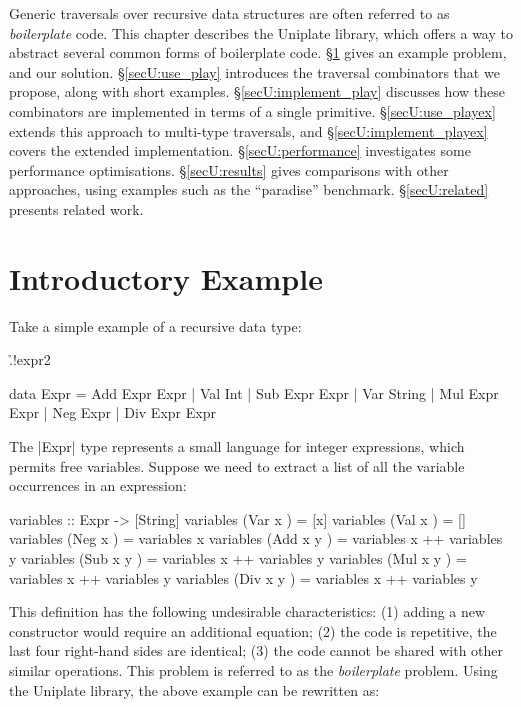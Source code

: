 Generic traversals over recursive data structures are often referred to as \textit{boilerplate} code. This chapter describes the Uniplate library, which offers a way to abstract several common forms of boilerplate code. \S\ref{secU:intro} gives an example problem, and our solution. \S\ref{secU:use_play} introduces the traversal combinators that we propose, along with short examples. \S\ref{secU:implement_play} discusses how these combinators are implemented in terms of a single primitive. \S\ref{secU:use_playex} extends this approach to multi-type traversals, and \S\ref{secU:implement_playex} covers the extended implementation. \S\ref{secU:performance} investigates some performance optimisations. \S\ref{secU:results} gives comparisons with other approaches, using examples such as the ``paradise'' benchmark. \S\ref{secU:related} presents related work.




\section{Introductory Example}
\label{secU:intro}

Take a simple example of a recursive data type:

\h{.!expr2}\begin{code}
data Expr  =  Add  Expr  Expr  |  Val  Int
           |  Sub  Expr  Expr  |  Var  String
           |  Mul  Expr  Expr  |  Neg  Expr
           |  Div  Expr  Expr
\end{code}

The |Expr| type represents a small language for integer expressions, which permits free variables. Suppose we need to extract a list of all the variable occurrences in an expression:

\begin{onepage}
\begin{code}
variables :: Expr -> [String]
variables (Var  x    ) = [x]
variables (Val  x    ) = []
variables (Neg  x    ) = variables x
variables (Add  x y  ) = variables x ++ variables y
variables (Sub  x y  ) = variables x ++ variables y
variables (Mul  x y  ) = variables x ++ variables y
variables (Div  x y  ) = variables x ++ variables y
\end{code}
\end{onepage}

This definition has the following undesirable characteristics: (1) adding a new constructor would require an additional equation; (2) the code is repetitive, the last four right-hand sides are identical; (3) the code cannot be shared with other similar operations. This problem is referred to as the \textit{boilerplate} problem. Using the Uniplate library, the above example can be rewritten as:

